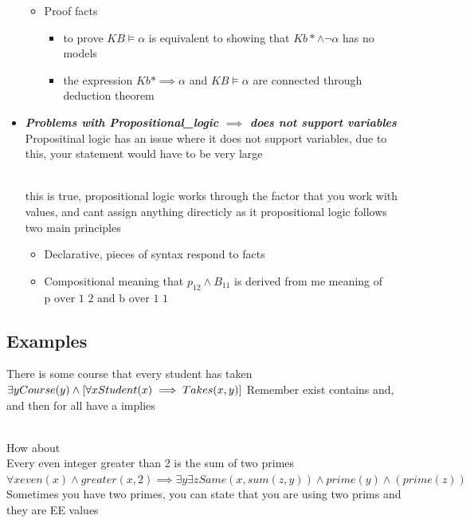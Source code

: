 \documentclass{article}
\theoremstyle{mytheoremstyle}
\theoremstyle{mytheoremstyle}
\theoremstyle{myproblemstyle}
\begin{document}
\begin{itemize}
\begin{itemize}
		      \item Proof facts
		            \begin{itemize}
			            \item to prove \( KB \models \alpha  \) is equivalent to showing that \( Kb* \land \neg \alpha  \) has no models
			            \item the expression \( Kb* \implies  \alpha  \) and \( KB \models \alpha  \) are connected through deduction theorem
		            \end{itemize}

	      \end{itemize}
	\item \textbf{\textit{Problems with Propositional_logic \( \implies  \)   does not support variables}}
	      Propositinal logic has an issue where it does not support variables, due to this, your statement would have to be very large

	      \\
	      this is true, propositional logic works through the factor that you work with values, and cant assign anything directicly as it propositional logic follows two main principles
	      \begin{itemize}
		      \item Declarative, pieces of syntax respond to facts
		      \item Compositional
		            meaning that \( p_{12} \land B_{11}\) is derived from me meaning of \( \text{p over 1 2 and b over 1 1 } \)
	      \end{itemize}


\end{itemize}

\subsection{Examples}
There is some course that every student has taken
\begin{math}
	\exists y Course(y) \land [\forall x Student(x) \implies Takes(x,y)]\\
\end{math}
Remember exist contains and, and then for all have a implies

\\
How about \\

Every even integer greater than 2 is the sum of two primes
\begin{math}
	\forall x even(x) \land greater(x,2) \implies  \exists y \exists z Same(x,sum(z,y)) \land prime(y) \land(prime(z))
\end{math}
Sometimes you have two primes, you can state that you are using two prims and they are EE values
\end{document}
